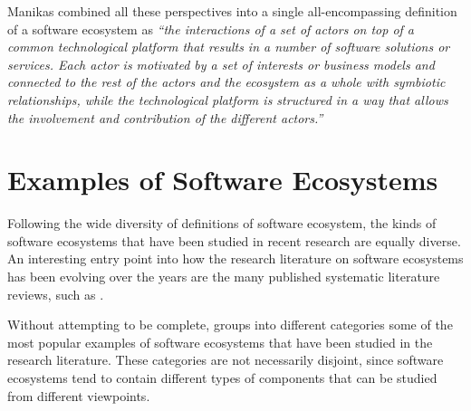 Manikas \cite{ManikasHansen2013} combined all these perspectives into a single all-encompassing definition of a software ecosystem as \emph{``the interactions of a set of actors on top of a common technological platform that results in a number of software solutions or services. Each actor is motivated by a set of interests or business models and connected to the rest of the actors and the ecosystem as a whole with symbiotic relationships, while the technological platform is structured in a way that allows the involvement and contribution of the different actors.''}



\section{Examples of Software Ecosystems}
\label{INT:sec:SECO-examples}

Following the wide diversity of definitions of software ecosystem, the kinds of software ecosystems that have been studied in recent research are equally diverse.
An interesting entry point into how the research literature on software ecosystems has been evolving over the years are the many published systematic literature reviews, such as \cite{Barbosa2011, ManikasHansen2013, Manikas2016, Seppanen2017, Burstrom2022}.

Without attempting to be complete,  groups into different categories some of the most popular examples of software ecosystems that have been studied in the research literature. These categories are not necessarily disjoint, since software ecosystems tend to contain different types of components that can be studied from different viewpoints.

